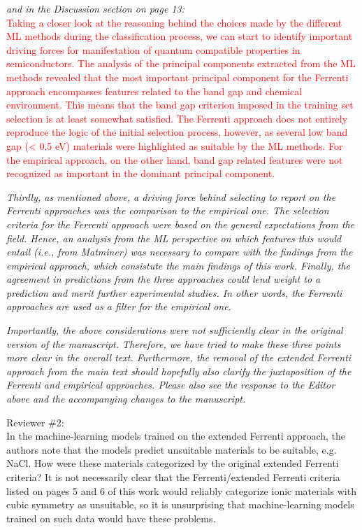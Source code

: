 \documentclass[11pt, a4paper]{letter} %
\newcommand{\mrk}[1]{\textcolor{red}{#1}}
\begin{document}
\textit{and in the Discussion section on page 13:} \\ 
\mrk{Taking a closer look at the reasoning behind the choices made by the different ML methods during the classification process, we can start to identify important driving forces for manifestation of quantum compatible properties in
semiconductors. The analysis of the principal components extracted from the ML methods revealed that the most important principal component for the Ferrenti approach encompasses features related to the band gap and chemical environment. This means that the band gap criterion imposed in the training set selection is at least somewhat satisfied. The Ferrenti approach does not entirely reproduce the logic of the initial selection process, however, as several low band gap (< 0.5 eV) materials were highlighted as suitable by the ML methods. For the empirical approach, on the other hand, band gap related features were not recognized as important in the dominant principal component.}

\textit{Thirdly, as mentioned above, a driving force behind selecting to report on the Ferrenti approaches was the comparison to the empirical one. The selection criteria for the Ferrenti approach were based on the general  expectations from the field. Hence, an analysis from the ML perspective on which features this would entail (i.e., from Matminer) was necessary to compare with the findings from the empirical approach, which consistute the main findings of this work. Finally, the agreement in predictions from the three approaches could lend weight to a prediction and merit further experimental studies. In other words, the Ferrenti approaches are used as a filter for the empirical one. }

\textit{Importantly, the above considerations were not sufficiently clear in the original version of the manuscript. Therefore, we have tried to make these three points more clear in the overall text. Furthermore, the removal of the extended Ferrenti approach from the main text should hopefully also clarify the juxtaposition of the Ferrenti and empirical approaches. Please also see the response to the Editor above and the accompanying changes to the manuscript.}  


Reviewer \#2: \\
In the machine-learning models trained on the extended Ferrenti approach, the authors note that the models predict unsuitable materials to be suitable, e.g. NaCl. How were these materials categorized by the original extended Ferrenti criteria? It is not necessarily clear that the Ferrenti/extended Ferrenti criteria listed on pages 5 and 6 of this work would reliably categorize ionic materials with cubic symmetry as unsuitable, so it is unsurprising that machine-learning models trained on such data would have these problems.
\end{document}
